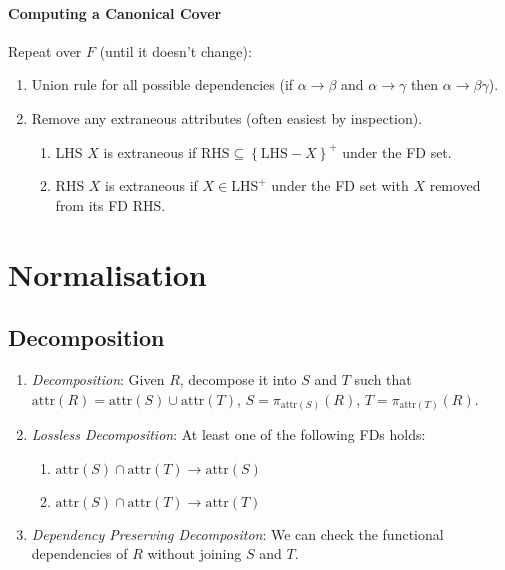 \documentclass[twocolumn,english]{article}
\begin{document}
\paragraph{Computing a Canonical Cover}

Repeat over $F$ (until it doesn't change):
\begin{enumerate}
\item Union rule for all possible dependencies (if $\alpha\rightarrow\beta$
and $\alpha\rightarrow\gamma$ then $\alpha\rightarrow\beta\gamma$).
\item Remove any extraneous attributes (often easiest by inspection).

\begin{enumerate}
\item LHS $X$ is extraneous if $\mbox{RHS}\subseteq\left\{ \mbox{LHS}-X\right\} ^{+}$
under the FD set.
\item RHS $X$ is extraneous if $X\in\mbox{LHS}^{+}$ under the FD set with
$X$ removed from its FD RHS.
\end{enumerate}
\end{enumerate}

\section{Normalisation}


\subsection{Decomposition}
\begin{enumerate}
\item \emph{Decomposition}: Given $R$, decompose it into $S$ and $T$
such that $\mbox{attr}\left(R\right)=\mbox{attr}\left(S\right)\cup\mbox{attr}\left(T\right)$,
$S=\pi_{\mbox{attr}\left(S\right)}\left(R\right)$, $T=\pi_{\mbox{attr}\left(T\right)}\left(R\right)$.
\item \emph{Lossless Decomposition}: At least one of the following FDs holds:

\begin{enumerate}
\item $\mbox{attr}\left(S\right)\cap\mbox{attr}\left(T\right)\rightarrow\mbox{attr}\left(S\right)$
\item $\mbox{attr}\left(S\right)\cap\mbox{attr}\left(T\right)\rightarrow\mbox{attr}\left(T\right)$
\end{enumerate}
\item \emph{Dependency Preserving Decompositon}: We can check the functional
dependencies of $R$ without joining $S$ and $T$.
\end{enumerate}
\end{document}
